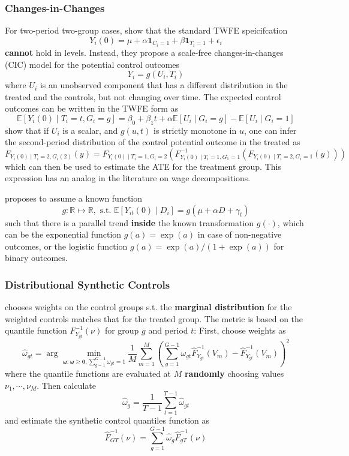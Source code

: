 \documentclass[twoside]{article}
\begin{document}
\subsubsection{Changes-in-Changes}
For two-period two-group cases, \citet{athey2006identification} show that the standard TWFE speicifcation 
$$ Y_i(0) = \mu + \alpha\mathbf{1}_{C_i=1} + \beta\mathbf{1}_{T_i=1} + \epsilon_i $$
\textbf{cannot} hold in levels. Instead, they propose a scale-free changes-in-changes (CIC) model for the potential control outcomes 
$$ Y_i = g(U_i,T_i) $$
where $U_i$ is an unobserved component that has a different distribution in the treated and the controls, but not changing over time. The expected control outcomes can be written in the TWFE form as 
$$ \mathbb{E}\left[Y_i(0)\mid T_i=t,G_i=g\right] = \beta_0+\beta_1t + \alpha\mathbb{E}\left[U_i\mid G_i=g\right] - \mathbb{E}\left[U_i\mid G_i=1\right]$$
\citet{athey2006identification} show that if $U_i$ is a scalar, and $g(u,t)$ is strictly monotone in $u$, one can infer the second-period distribution of the control potential outcome in the treated as 
\begin{equation*}
    F_{Y_i(0)\mid T_i=2,G_i(2)}(y) = F_{Y_i(0)\mid T_i=1,G_i=2} \left( F^{-1}_{Y_i(0)\mid T_i=1,G_1=1}\left(F_{Y_i(0)\mid T_i=2,G_i=1}(y)\right) \right)
\end{equation*}
which can then be used to estimate the ATE for the treatment group. This expression has an analog in the literature on wage decompositions.

\citet{wooldridge2023simple} proposes to assume a known function $$ g:\mathbb{R} \mapsto \mathbb{R}, \text{ s.t. }\mathbb{E}\left[Y_{it}(0)\mid D_i\right] = g(\mu+\alpha D+\gamma_t) $$
such that there is a parallel trend \textbf{inside} the known transformation $g(\cdot)$, which can be the exponential function $g(a)=\exp(a)$ in case of non-negative outcomes, or the logistic function $g(a)=\exp(a)/(1+\exp(a))$ for binary outcomes.

\subsubsection{Distributional Synthetic Controls}

\citet{gunsilius2023distributional} chooses weights on the control groups s.t. the \textbf{marginal distribution} for the weighted controls matches that for the treated group. The metric is based on the quantile function $F^{-1}_{Y_{gt}}(\nu)$ for group $g$ and period $t$:
First, choose weights as 
\begin{equation*}
    \hat{\omega}_{gt} = \arg \min_{\boldsymbol{\omega}:\boldsymbol{\omega}\geq \mathbf{0},\sum^{G-1}_{g=1}\omega_{gt}=1} \frac{1}{M} \sum^M_{m=1}\left( \sum^{G-1}_{g=1}\omega_{gt}\hat{F}^{-1}_{Y_{gt}}(V_m) - \hat{F}^{-1}_{Y_{gt}}(V_m) \right)^2
\end{equation*}
where the quantile functions are evaluated at $M$ \textbf{randomly} choosing values $\nu_1,\cdots,\nu_M$. Then calculate
$$ \hat{\omega}_g = \frac{1}{T-1}\sum^{T-1}_{t=1}\hat{\omega}_{gt} $$
and estimate the synthetic control quantiles function as 
$$ \hat{F}^{-1}_{GT}(\nu) = \sum^{G-1}_{g=1}\hat{\omega}_g \hat{F}_{gT}^{-1}(\nu) $$
\end{document}
